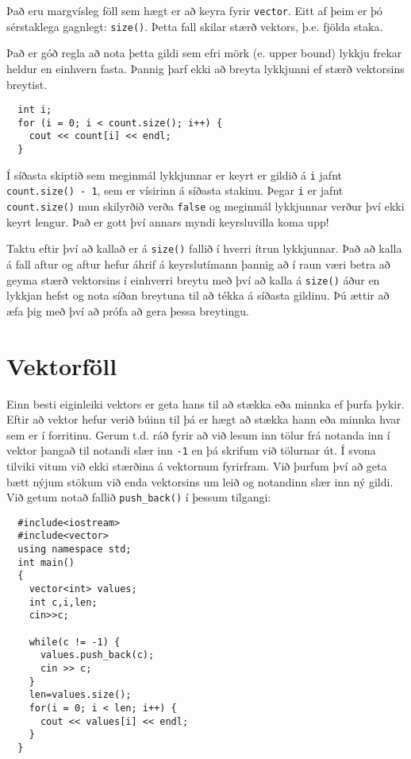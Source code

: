 Það eru margvísleg föll sem hægt er að keyra fyrir {\tt vector}.
Eitt af þeim er þó sérstaklega gagnlegt: {\tt size()}.
Þetta fall skilar stærð vektors, þ.e. fjölda staka.

Það er góð regla að nota þetta gildi sem efri mörk (e. upper bound) lykkju frekar heldur en einhvern fasta.
Þannig þarf ekki að breyta lykkjunni ef stærð vektorsins breytist.

\begin{verbatim}
  int i;
  for (i = 0; i < count.size(); i++) {
    cout << count[i] << endl;
  }
\end{verbatim}
%
Í síðasta skiptið sem meginmál lykkjunnar er keyrt er gildið á {\tt i} jafnt {\tt count.size() - 1}, sem er vísirinn á síðasta stakinu.
Þegar {\tt i} er jafnt {\tt count.size()} mun skilyrðið verða {\tt false} og meginmál lykkjunnar verður því ekki keyrt lengur.
Það er gott því annars myndi keyrsluvilla koma upp!

Taktu eftir því að kallað er á {\tt size()} fallið í hverri ítrun lykkjunnar.
Það að kalla á fall aftur og aftur hefur áhrif á keyrslutímann þannig að í raun væri betra að geyma stærð vektorsins í einhverri breytu með því að kalla á 
{\tt size()} áður en lykkjan hefst og nota síðan breytuna til að tékka á síðasta gildinu.
Þú ættir að æfa þig með því að prófa að gera þessa breytingu.

\section{Vektorföll}

Einn besti eiginleiki vektors er geta hans til að stækka eða minnka ef þurfa þykir.
Eftir að vektor hefur verið búinn til þá er hægt að stækka hann eða minnka hvar sem er í forritinu.
Gerum t.d. ráð fyrir að við lesum inn tölur frá notanda inn í vektor þangað til notandi slær inn {\tt -1} en þá skrifum við tölurnar út.
Í svona tilviki vitum við ekki stærðina á vektornum fyrirfram.
Við þurfum því að geta bætt nýjum stökum við enda vektorsins um leið og notandinn slær inn ný gildi.
Við getum notað fallið {\tt push\_back()} í þessum tilgangi:

\begin{verbatim}
  #include<iostream>
  #include<vector>
  using namespace std;
  int main()
  {
    vector<int> values;
    int c,i,len;
    cin>>c;
    
    while(c != -1) {
      values.push_back(c);
      cin >> c;
    }
    len=values.size();
    for(i = 0; i < len; i++) {
      cout << values[i] << endl;
    }
  }

\end{verbatim}

